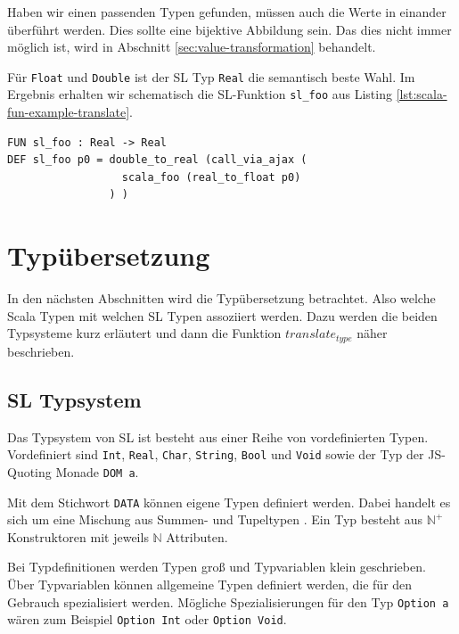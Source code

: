 \documentclass[12pt,bibtotoc]{scrreprt}
\begin{document}
Haben wir einen passenden Typen gefunden, müssen auch die Werte in einander überführt werden. Dies sollte eine bijektive Abbildung sein. Das dies nicht immer möglich ist, wird in Abschnitt \ref{sec:value-transformation} behandelt.

Für \lstinline!Float! und \lstinline!Double! ist der SL Typ \lstinline!Real! die semantisch beste Wahl. Im Ergebnis erhalten wir schematisch die SL-Funktion \lstinline!sl_foo! aus Listing \ref{lst:scala-fun-example-translate}.

\begin{lstlisting}[caption=Übersetzung von scala\_foo, label=lst:scala-fun-example-translate]
FUN sl_foo : Real -> Real
DEF sl_foo p0 = double_to_real (call_via_ajax (
                  scala_foo (real_to_float p0) 
                ) )
\end{lstlisting}

\section{Typübersetzung}
\label{sec:type-translation}

In den nächsten Abschnitten wird die Typübersetzung betrachtet. Also welche Scala Typen mit welchen SL Typen assoziiert werden. Dazu werden die beiden Typsysteme kurz erläutert und dann die Funktion $translate_{type}$ näher beschrieben.

\subsection{SL Typsystem}
\label{subsec:sl-typesystem}

Das Typsystem von SL ist besteht aus einer Reihe von vordefinierten Typen. Vordefiniert sind \lstinline!Int!, \lstinline!Real!, \lstinline!Char!, \lstinline!String!, \lstinline!Bool! und \lstinline!Void! sowie der Typ der \ac{JS}-Quoting Monade \lstinline!DOM a!.

Mit dem Stichwort \lstinline!DATA! können eigene Typen definiert werden. Dabei handelt es sich um eine Mischung aus Summen- und Tupeltypen \cite[S.119f u. S. 123]{Pepper2007}. Ein Typ besteht aus $\mathbb{N}^+$ Konstruktoren mit jeweils $\mathbb{N}$ Attributen.

Bei Typdefinitionen werden Typen groß und Typvariablen klein geschrieben. Über Typvariablen können allgemeine Typen definiert werden, die für den Gebrauch spezialisiert werden. Mögliche Spezialisierungen für den Typ \lstinline!Option a! wären zum Beispiel \lstinline!Option Int! oder \lstinline!Option Void!.
\end{document}
